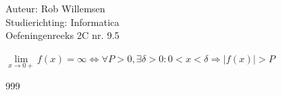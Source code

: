 \documentclass[a4paper]{article}
\begin{document}
\noindent \large Auteur: Rob Willemsen \\
\noindent \large Studierichting: Informatica\\
\noindent \large Oefeningenreeks 2C nr. 9.5\\

\medskip

\normalsize

$\lim\limits_{x \rightarrow 0+} f(x) = \infty \Leftrightarrow \forall P > 0, \exists \delta > 0 : 0 < x < \delta \Rightarrow |f(x)| > P $ \\

\begin{thebibliography}{999}
\end{thebibliography}
\end{document}
